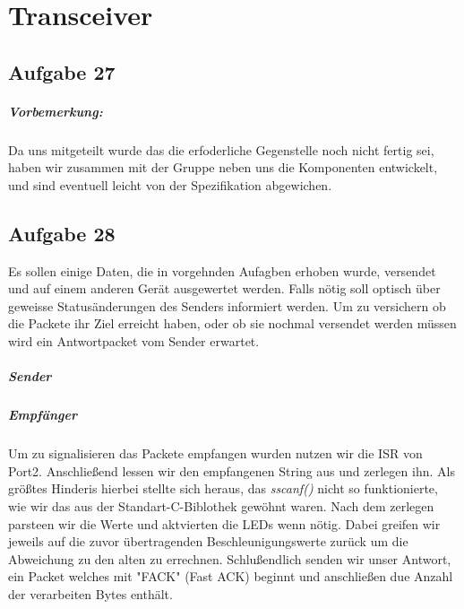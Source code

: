 \chapter{Transceiver}

\section*{Aufgabe 27}

\paragraph*{Vorbemerkung:} Da uns mitgeteilt wurde das die erfoderliche Gegenstelle noch nicht fertig sei, haben wir zusammen mit der Gruppe neben uns die Komponenten entwickelt, und sind eventuell leicht von der Spezifikation abgewichen. 




\section{Aufgabe 28}
Es sollen einige Daten, die in vorgehnden Aufagben erhoben wurde, versendet und auf einem anderen Gerät ausgewertet werden. Falls nötig soll optisch über geweisse Statusänderungen des Senders informiert werden. Um zu versichern ob die Packete ihr Ziel erreicht haben, oder ob sie nochmal versendet werden müssen wird ein Antwortpacket vom Sender erwartet.


\paragraph*{Sender}


\paragraph*{Empfänger}
Um zu signalisieren das Packete empfangen wurden nutzen wir die ISR von Port2. Anschließend lessen wir den empfangenen String aus und zerlegen ihn. Als größtes Hinderis hierbei stellte sich heraus, das {\em sscanf()} nicht so funktionierte, wie wir das aus der Standart-C-Biblothek gewöhnt waren. Nach dem zerlegen parsteen wir die Werte und aktvierten die LEDs wenn nötig. Dabei greifen wir jeweils auf die zuvor übertragenden Beschleunigungswerte zurück um die Abweichung zu den alten zu errechnen. Schlußendlich senden wir unser Antwort, ein Packet welches mit "FACK" (Fast ACK) beginnt und anschließen due Anzahl der verarbeiten Bytes enthält. 






